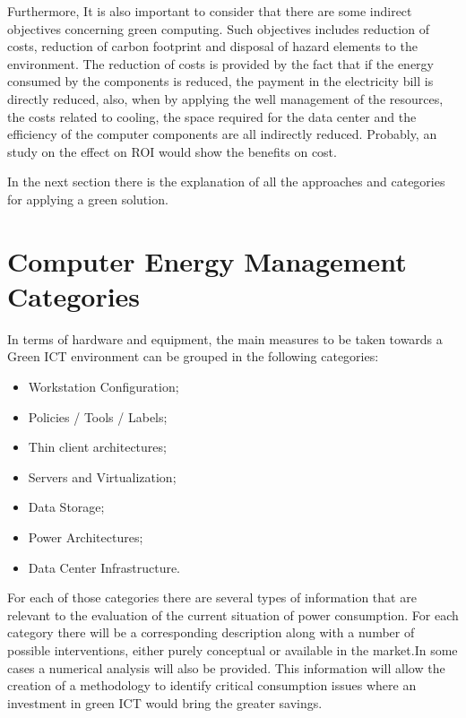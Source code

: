         Furthermore, It is also important to consider that there are some indirect objectives concerning green computing. Such objectives includes reduction of costs, reduction of carbon footprint and disposal of hazard elements to the environment. The reduction of costs is provided by the fact that if the energy consumed by the components is reduced, the payment in the electricity bill is directly reduced, also, when by applying the well management of the resources, the costs related to cooling, the space required for the data center and the efficiency of the computer components are all indirectly reduced. Probably, an study on the effect on ROI would show the benefits on cost.
    
        In the next section there is the explanation of all the approaches and categories for applying a green solution.
    
    \section{Computer Energy Management Categories} \label{sec2:energy_categories}

    In terms of hardware and equipment, the main measures to be taken towards a Green ICT environment can be grouped in the following categories:
    \begin{itemize}
        \item Workstation Configuration;
        \item Policies / Tools / Labels;
        \item Thin client architectures;
        \item Servers and Virtualization;
        \item Data Storage;
        \item Power Architectures;
        \item Data Center Infrastructure.
    \end{itemize}
    
    For each of those categories there are several types of information that are relevant to the evaluation of the current situation of power consumption. For each category there will be a corresponding description along with a number of possible interventions, either purely conceptual or available in the market.In some cases a numerical analysis will also be provided. This information will allow the creation of a methodology to identify critical consumption issues where an investment in green ICT would bring the greater savings.
    
